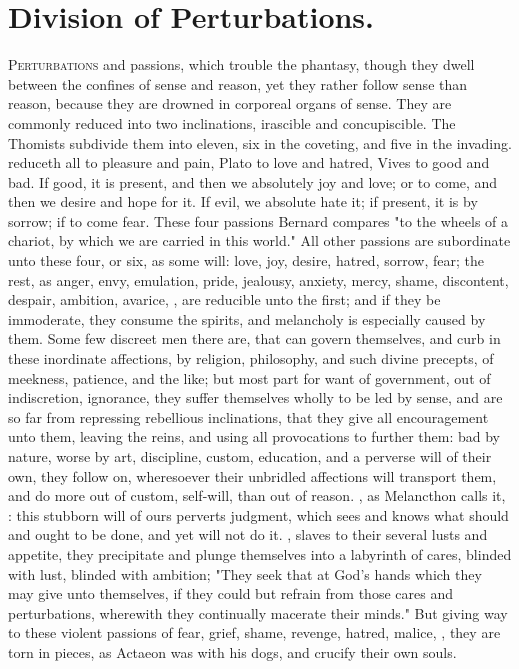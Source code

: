 \section{Division of Perturbations.}

\lettrine{P}{erturbations} and passions, which trouble the phantasy, though
they dwell between the confines of sense and reason, yet they rather follow
sense than reason, because they are drowned in corporeal organs of sense. They
are commonly reduced into two inclinations, irascible and
concupiscible. The Thomists subdivide them into eleven, six in the coveting,
and five in the invading. \Aristotle{} reduceth all to pleasure and pain, Plato to
love and hatred, Vives to good and bad. If good, it is
present, and then we absolutely joy and love; or to come, and then we desire
and hope for it. If evil, we absolute hate it; if present, it is by sorrow; if
to come fear. These four passions Bernard compares "to the
wheels of a chariot, by which we are carried in this world." All other passions
are subordinate unto these four, or six, as some will: love, joy, desire,
hatred, sorrow, fear; the rest, as anger, envy, emulation, pride, jealousy,
anxiety, mercy, shame, discontent, despair, ambition, avarice, \etc{}, are
reducible unto the first; and if they be immoderate, they
consume the spirits, and melancholy is especially caused
by them. Some few discreet men there are, that can govern themselves, and curb
in these inordinate affections, by religion, philosophy, and such divine
precepts, of meekness, patience, and the like; but most part for want of
government, out of indiscretion, ignorance, they suffer themselves wholly to be
led by sense, and are so far from repressing rebellious inclinations, that they
give all encouragement unto them, leaving the reins, and using all provocations
to further them: bad by nature, worse by art, discipline,
custom, education, and a perverse will of their own, they
follow on, wheresoever their unbridled affections will transport them, and do
more out of custom, self-will, than out of reason. , as
Melancthon calls it, : this stubborn will of ours perverts
judgment, which sees and knows what should and ought to be done, and yet will
not do it. , slaves to their several lusts and appetite,
they precipitate and plunge themselves into a labyrinth of
cares, blinded with lust, blinded with ambition; "They
seek that at God's hands which they may give unto themselves, if they could but
refrain from those cares and perturbations, wherewith they continually macerate
their minds." But giving way to these violent passions of fear, grief, shame,
revenge, hatred, malice, \etc{}, they are torn in pieces, as Actaeon was with
his dogs, and crucify their own souls.

